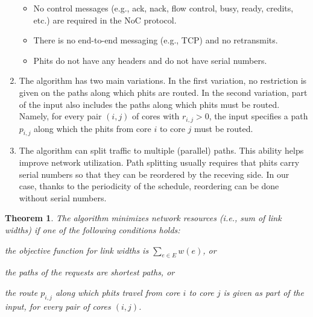 \documentclass[a4paper,12pt]{article}
\newenvironment{proof sketch}[1]{\noindent {\emph{Proof sketch of #1:}}}{\hfill \qed}
\newtheorem{theorem}{Theorem}
\begin{document}
\begin{enumerate}
\begin{itemize}
  \item No control messages (e.g., ack, nack, flow control, busy, ready, credits,
    etc.)  are required in the NoC protocol.
  \item There is no end-to-end messaging (e.g., TCP) and no retransmits.
  \item Phits do not have any headers and do not have serial numbers.
  \end{itemize}
\item The algorithm has two main variations. In the first variation, no restriction
  is given on the paths along which phits are routed. In the second variation, part
  of the input also includes the paths along which phits must be routed. Namely, for
  every pair $(i,j)$ of cores with $r_{i,j}>0$, the input specifies a path $p_{i,j}$
  along which the phits from core $i$ to core $j$ must be routed.
\item The algorithm can split traffic to multiple (parallel) paths. This
  ability helps improve network utilization.
  Path splitting usually requires that phits carry serial numbers so that they can be
  reordered by the receving side. In our case, thanks to the periodicity of the
  schedule, reordering can be done without serial numbers.
\end{enumerate}

\begin{theorem}
  The algorithm minimizes network resources (i.e., sum of link widths) if one of the
  following conditions holds: 
  \begin{inparaenum}[(i)]
  \item the objective function for link widths is $\sum_{e\in E} w(e)$, or
  \item the paths of the requests are shortest paths, or
  \item the route $p_{i,j}$ along which phits travel from core $i$ to core $j$ is
    given as part of the input, for every pair of cores $(i,j)$.
  \end{inparaenum}
\end{theorem}
\end{document}
